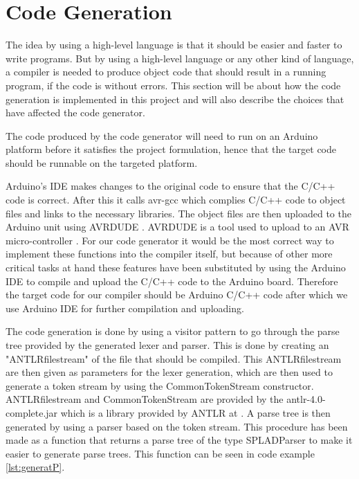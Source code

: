 \section{Code Generation}
\label{codegeneration}
The idea by using a high-level language is that it should be easier and faster to write programs. But by using a high-level language or any other kind of language, a compiler is needed to produce object code that should result in a running program, if the code is without errors. This section will be about how the code generation is implemented in this project and will also describe the choices that have affected the code generator.

The code produced by the code generator will need to run on an Arduino platform before it satisfies the project formulation, hence that the target code should be runnable on the targeted platform.

Arduino's IDE makes changes to the original code to ensure that the C/C++ code is correct. After this it calls avr-gcc which complies C/C++ code to object files and links to the necessary libraries. The object files are then uploaded to the Arduino unit using AVRDUDE \citep{Buildproc}. AVRDUDE is a tool used to upload to an AVR micro-controller \citep{AVRDUDE}. For our code generator it would be the most correct way to implement these functions into the compiler itself, but because of other more critical tasks at hand these features have been substituted by using the Arduino IDE to compile and upload the C/C++ code to the Arduino board. Therefore the target code for our compiler should be Arduino C/C++ code after which we use Arduino IDE for further compilation and uploading.


The code generation is done by using a visitor pattern to go through the parse tree provided by the generated lexer and parser. This is done by creating an "ANTLRfilestream" of the file that should be compiled. This ANTLRfilestream are then given as parameters for the lexer generation, which are then used to generate a token stream by using the CommonTokenStream constructor. ANTLRfilestream and CommonTokenStream are provided by the antlr-4.0-complete.jar which is a library provided by ANTLR at \citep{DownloadANTLR}. A parse tree is then generated by using a parser based on the token stream. This procedure has been made as a function that returns a parse tree of the type SPLADParser to make it easier to generate parse trees. This function can be seen in code example \ref{lst:generatP}.

